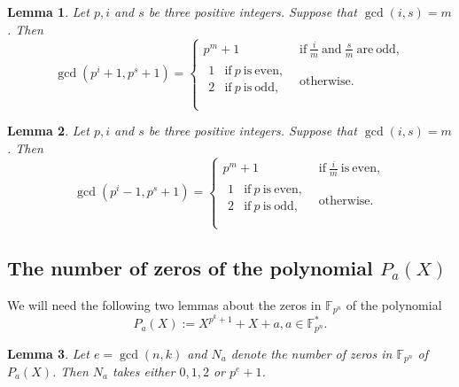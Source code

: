 \documentclass[sn-mathphys-num]{sn-jnl}%
\theoremstyle{thmstyleone}%
\newtheorem{lemma}{Lemma}
\theoremstyle{thmstyletwo}%
\theoremstyle{thmstylethree}%
\begin{document}
\begin{lemma}\label{sec2.2 lem2}
	Let $p,i$ and $s$ be three positive integers. Suppose that $\gcd(i,s)=m$. Then
	\begin{equation*}
		\gcd(p^i+1,p^s+1)=\left\{\begin{array}{ll}
			p^m+1 &\mathrm{if}\ \frac{i}{m}\ \mathrm{and}\ \frac{s}{m}\ \mathrm{are\ odd},\\
			\begin{array}{ll}
				1&\mathrm{if}\ p\ \mathrm{is\ even,}\\
				2&\mathrm{if}\ p\ \mathrm{is\ odd,}\\
			\end{array} &\mathrm{otherwise}.\\
		\end{array}\right.
	\end{equation*}
\end{lemma}

\begin{lemma}\cite[Lemma 2.6]{Coulter1998Explicit}\cite[Lemma 2.1]{Coulter1999Evaluation}
	\label{sec2.2 lem3}
	Let $p,i$ and $s$ be three positive integers. Suppose that $\gcd(i,s)=m$. Then
	\begin{equation*}
		\gcd(p^i-1,p^s+1)=\left\{\begin{array}{ll}
			p^m+1 &\mathrm{if}\ \frac{i}{m}\ \mathrm{is\ even},\\
			\begin{array}{ll}
				1&\mathrm{if}\ p\ \mathrm{is\ even,}\\
				2&\mathrm{if}\ p\ \mathrm{is\ odd,}\\
			\end{array} &\mathrm{otherwise}.\\
		\end{array}\right.
	\end{equation*}
\end{lemma}

\subsection{The number of zeros of the polynomial $P_a(X)$}
We will need the following two lemmas about the zeros in $\mathbb{F}_{p^n}$ of the polynomial
\begin{equation*}
	P_a(X):=X^{p^k+1}+X+a,a\in\mathbb{F}_{p^n}^\ast.
\end{equation*}

\begin{lemma}\cite{Bluher2004Xq}
	\label{sec2.3 lem1}
	Let $e=\gcd(n,k)$ and $N_a$ denote the number of zeros in $\mathbb{F}_{p^n}$ of $P_a(X)$. Then $N_a$ takes either $0,1,2$ or $p^{e}+1$.
\end{lemma}
\end{document}

